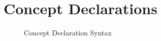 \section{Concept Declarations}\label{sec:concept-decl}

\begin{figure}
\verbatimfont{\small}
\begin{framed}

\end{framed}
\caption{Concept Declaration Syntax}
\label{fig:concept-syntax}
\end{figure}

